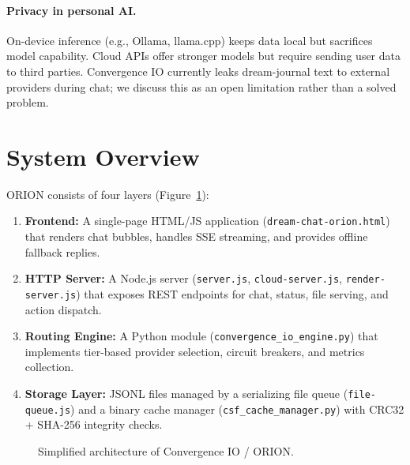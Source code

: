 \documentclass{article}
\begin{document}
\paragraph{Privacy in personal AI.} On-device inference (e.g., Ollama,
llama.cpp) keeps data local but sacrifices model capability. Cloud APIs offer
stronger models but require sending user data to third parties. Convergence IO
currently leaks dream-journal text to external providers during chat; we
discuss this as an open limitation rather than a solved problem.

\section{System Overview}

ORION consists of four layers (Figure~\ref{fig:arch}):

\begin{enumerate}[label=(\arabic*)]
    \item \textbf{Frontend:} A single-page HTML/JS application
    (\texttt{dream-chat-orion.html}) that renders chat bubbles, handles SSE
    streaming, and provides offline fallback replies.
    \item \textbf{HTTP Server:} A Node.js server (\texttt{server.js},
    \texttt{cloud-server.js}, \texttt{render-server.js}) that exposes REST
    endpoints for chat, status, file serving, and action dispatch.
    \item \textbf{Routing Engine:} A Python module
    (\texttt{convergence\_io\_engine.py}) that implements tier-based provider
    selection, circuit breakers, and metrics collection.
    \item \textbf{Storage Layer:} JSONL files managed by a serializing file
    queue (\texttt{file-queue.js}) and a binary cache manager
    (\texttt{csf\_cache\_manager.py}) with CRC32 + SHA-256 integrity checks.
\end{enumerate}

\begin{figure}[h]
\centering
{}
\caption{Simplified architecture of Convergence IO / ORION.}
\label{fig:arch}
\end{figure}
\end{document}
